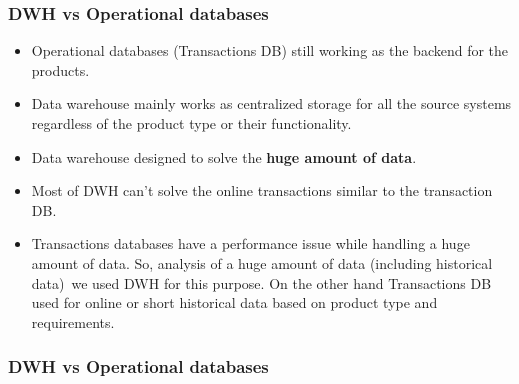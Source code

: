 

\begin{frame}
\frametitle{DWH vs Operational databases}
\begin{itemize}[<+->]
		\item Operational databases (Transactions DB) still working as the backend for the products.
		\item Data warehouse mainly works as centralized storage for all the source systems regardless of the product type or their functionality.
		\item Data warehouse designed to solve the \textbf{huge amount of data}.
		\item Most of DWH can't solve the online transactions similar to the transaction DB.
		\item Transactions databases have a performance issue while handling a huge amount of data. So, analysis of a huge amount of data (including historical data) we used DWH for this purpose. On the other hand Transactions DB used for online or short historical data based on product type and requirements.
\end{itemize}
\end{frame}



\begin{frame}
\frametitle{DWH vs Operational databases}


\begin{table}[t]
\centering	
{}
\end{table}
\end{frame}


